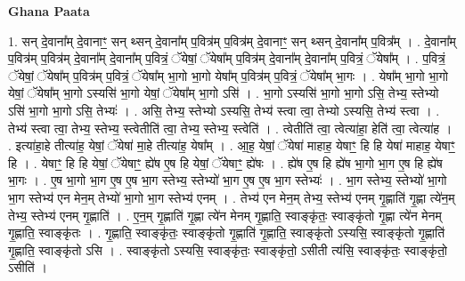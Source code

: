 \documentclass[17pt]{extarticle}
\begin{document}
\textbf{Ghana Paata } \newline

1. सन् दे॒वाना᳚म् दे॒वानाꣳ॒॒ सन् थ्सन् दे॒वाना᳚म् प॒वित्र॑म् प॒वित्र॑म् दे॒वानाꣳ॒॒ सन् थ्सन् दे॒वाना᳚म् प॒वित्र᳚म् । . दे॒वाना᳚म् प॒वित्र॑म् प॒वित्र॑म् दे॒वाना᳚म् दे॒वाना᳚म् प॒वित्रं॒ ॅयेषां॒ ॅयेषा᳚म् प॒वित्र॑म् दे॒वाना᳚म् दे॒वाना᳚म् प॒वित्रं॒ ॅयेषा᳚म् । . प॒वित्रं॒ ॅयेषां॒ ॅयेषा᳚म् प॒वित्र॑म् प॒वित्रं॒ ॅयेषा᳚म् भा॒गो भा॒गो येषा᳚म् प॒वित्र॑म् प॒वित्रं॒ ॅयेषा᳚म् भा॒गः । . येषा᳚म् भा॒गो भा॒गो येषां॒ ॅयेषा᳚म् भा॒गो ऽस्यसि॑ भा॒गो येषां॒ ॅयेषा᳚म् भा॒गो ऽसि॑ । . भा॒गो ऽस्यसि॑ भा॒गो भा॒गो ऽसि॒ तेभ्य॒ स्तेभ्यो ऽसि॑ भा॒गो भा॒गो ऽसि॒ तेभ्यः॑ । . असि॒ तेभ्य॒ स्तेभ्यो ऽस्यसि॒ तेभ्य॑ स्त्वा त्वा॒ तेभ्यो ऽस्यसि॒ तेभ्य॑ स्त्वा । . तेभ्य॑ स्त्वा त्वा॒ तेभ्य॒ स्तेभ्य॒ स्त्वेतीति॑ त्वा॒ तेभ्य॒ स्तेभ्य॒ स्त्वेति॑ । . त्वेतीति॑ त्वा॒ त्वेत्या॑हा॒ हेति॑ त्वा॒ त्वेत्या॑ह । . इत्या॑हा॒हे तीत्या॑ह॒ येषां॒ ॅयेषा॑ मा॒हे तीत्या॑ह॒ येषा᳚म् । . आ॒ह॒ येषां॒ ॅयेषा॑ माहाह॒ येषाꣳ॒॒ हि हि येषा॑ माहाह॒ येषाꣳ॒॒ हि । . येषाꣳ॒॒ हि हि येषां॒ ॅयेषाꣳ॒॒ ह्ये॑ष ए॒ष हि येषां॒ ॅयेषाꣳ॒॒ ह्ये॑षः । . ह्ये॑ष ए॒ष हि ह्ये॑ष भा॒गो भा॒ग ए॒ष हि ह्ये॑ष भा॒गः । . ए॒ष भा॒गो भा॒ग ए॒ष ए॒ष भा॒ग स्तेभ्य॒ स्तेभ्यो॑ भा॒ग ए॒ष ए॒ष भा॒ग स्तेभ्यः॑ । . भा॒ग स्तेभ्य॒ स्तेभ्यो॑ भा॒गो भा॒ग स्तेभ्य॑ एन मेन॒म् तेभ्यो॑ भा॒गो भा॒ग स्तेभ्य॑ एनम् । . तेभ्य॑ एन मेन॒म् तेभ्य॒ स्तेभ्य॑ एनम् गृ॒ह्णाति॑ गृ॒ह्णा त्ये॑न॒म् तेभ्य॒ स्तेभ्य॑ एनम् गृ॒ह्णाति॑ । . ए॒न॒म् गृ॒ह्णाति॑ गृ॒ह्णा त्ये॑न मेनम् गृ॒ह्णाति॒ स्वाङ्कृ॑तः॒ स्वाङ्कृ॑तो गृ॒ह्णा त्ये॑न मेनम् गृ॒ह्णाति॒ स्वाङ्कृ॑तः । . गृ॒ह्णाति॒ स्वाङ्कृ॑तः॒ स्वाङ्कृ॑तो गृ॒ह्णाति॑ गृ॒ह्णाति॒ स्वाङ्कृ॑तो ऽस्यसि॒ स्वाङ्कृ॑तो गृ॒ह्णाति॑ गृ॒ह्णाति॒ स्वाङ्कृ॑तो ऽसि । . स्वाङ्कृ॑तो ऽस्यसि॒ स्वाङ्कृ॑तः॒ स्वाङ्कृ॑तो॒ ऽसीती त्य॑सि॒ स्वाङ्कृ॑तः॒ स्वाङ्कृ॑तो॒ ऽसीति॑ । \newline
\end{document}
